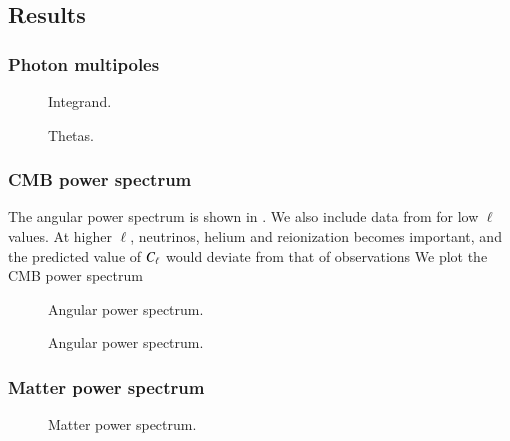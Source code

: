 \subsection{Results}\label{ssec:M4:results}

\subsubsection{Photon multipoles} \label{sssec:M4:results:photons_multipoles}
\begin{figure}[ht!]
    \caption{Integrand.}
    \label{fig:M4:results:integrand_thetas}
\end{figure}


\begin{figure}[ht!]
    \caption{Thetas. }
    \label{fig:M4:results:thetas}
\end{figure}

\subsubsection{CMB power spectrum} \label{sssec:M4:results:angular_power_spectrum}
The angular power spectrum is shown in . We also include data from \cite{Planck2020} for low $\ell$ values. At higher $\ell$, neutrinos, helium and reionization becomes important, and the predicted value of $C_\ell$ would deviate from that of observations  We plot the CMB power spectrum   
\begin{figure}[ht!]
    \caption{Angular power spectrum.}
    \label{fig:M4:results:cells}
\end{figure}


\begin{figure}[ht!]
    \caption{Angular power spectrum.}
    \label{fig:M4:results:cells_components}
\end{figure}

\subsubsection{Matter power spectrum} \label{sssec:M4:results:matter_power_spectrum}
\begin{figure}[ht!]
    \caption{Matter power spectrum.}
    \label{fig:M4:results:matterPS_nk1000}
\end{figure}